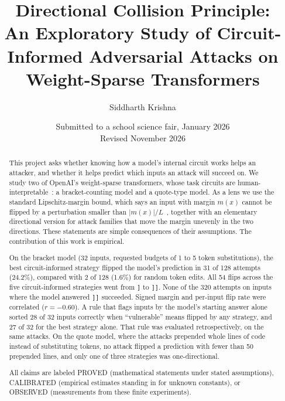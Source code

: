 \documentclass[11pt]{article}
\title{Directional Collision Principle:\\An Exploratory Study of Circuit-Informed Adversarial Attacks on Weight-Sparse Transformers}
\author{Siddharth Krishna}
\date{Submitted to a school science fair, January 2026\\Revised November 2026}
\newcommand{\lab}[1]{{\footnotesize\MakeUppercase{#1}}}
\newcommand{\proved}{\lab{proved}}
\newcommand{\calibrated}{\lab{calibrated}}
\newcommand{\observed}{\lab{observed}}
\newcommand{\rb}{\texttt{]}}
\newcommand{\rbb}{\texttt{]]}}
\begin{document}
\maketitle

\begin{abstract}
This project asks whether knowing how a model's internal circuit works helps an attacker, and whether it helps predict which inputs an attack will succeed on. We study two of OpenAI's weight-sparse transformers, whose task circuits are human-interpretable~\cite{gao2025}: a bracket-counting model and a quote-type model. As a lens we use the standard Lipschitz-margin bound, which says an input with margin $m(x)$ cannot be flipped by a perturbation smaller than $|m(x)|/L$~\cite{hein2017,tsuzuku2018}, together with an elementary directional version for attack families that move the margin unevenly in the two directions. These statements are simple consequences of their assumptions. The contribution of this work is empirical.

On the bracket model (32 inputs, requested budgets of 1 to 5 token substitutions), the best circuit-informed strategy flipped the model's prediction in 31 of 128 attempts (24.2\%), compared with 2 of 128 (1.6\%) for random token edits. All 54 flips across the five circuit-informed strategies went from \rb{} to \rbb{}. None of the 320 attempts on inputs where the model answered \rbb{} succeeded. Signed margin and per-input flip rate were correlated ($r = -0.60$). A rule that flags inputs by the model's starting answer alone sorted 28 of 32 inputs correctly when ``vulnerable'' means flipped by any strategy, and 27 of 32 for the best strategy alone. That rule was evaluated retrospectively, on the same attacks. On the quote model, where the attacks prepended whole lines of code instead of substituting tokens, no attack flipped a prediction with fewer than 50 prepended lines, and only one of three strategies was one-directional.

All claims are labeled \proved{} (mathematical statements under stated assumptions), \calibrated{} (empirical estimates standing in for unknown constants), or \observed{} (measurements from these finite experiments).
\end{abstract}

\begin{center}
\end{center}
\end{document}
